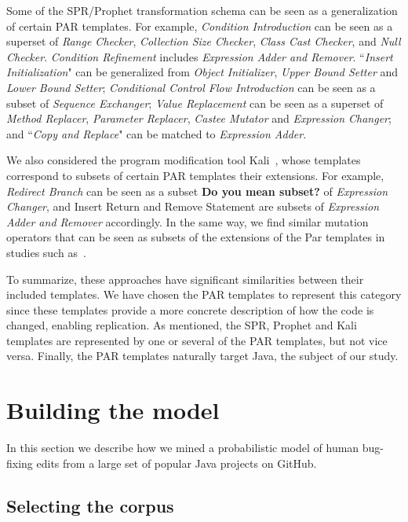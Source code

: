 \documentclass[conference]{IEEEtran}
\newcommand{\todo}[1]
  {{\scriptsize \textbf{\color{red} {#1}}}}
\begin{document}
Some of the SPR/Prophet transformation schema can be seen as a generalization of certain PAR 
templates. For example, \emph{Condition Introduction} can be seen as a superset of 
\emph{Range Checker}, \emph{Collection Size 
Checker}, \emph{Class Cast Checker}, and \emph{Null Checker}. \emph{Condition Refinement} includes \emph{Expression Adder and Remover}. ``\emph{Insert Initialization}" can be 
generalized from \emph{Object Initializer}, \emph{Upper Bound Setter} and \emph{Lower Bound Setter}; \emph{Conditional Control Flow Introduction} can be 
seen as a subset of \emph{Sequence Exchanger};
\emph{Value Replacement} can be seen as a superset of \emph{Method 
Replacer}, \emph{Parameter Replacer}, \emph{Castee Mutator} and \emph{Expression Changer}; and ``\emph{Copy 
and Replace}" can be matched to \emph{Expression Adder}. 

We also considered the program modification tool Kali~\cite{Qi15}, whose
templates correspond to subsets of certain PAR templates their extensions. 
For example, \emph{Redirect Branch} can be seen as
a subset \todo{Do you mean subset?}  of \emph{Expression Changer}, and Insert Return and Remove Statement are
subsets of \emph{Expression Adder and Remover} accordingly. In the same way, we find
similar mutation operators that can be seen as subsets of the extensions of the
Par templates in studies such as~\cite{Offutt96,Offutt06}. 

To summarize, these approaches have significant similarities between their
included templates.  We have chosen the PAR templates to represent this category 
since these templates provide a more concrete description of how the code is 
changed, enabling replication. As mentioned, 
the SPR, Prophet and Kali templates are represented by one or several of the PAR
templates, but not vice versa.  Finally, the PAR templates naturally target
Java, the subject of our study. 

\section{Building the model} \label{buildingTheModel}

In this section we describe how we mined a probabilistic
model of human bug-fixing edits from a large set of popular Java projects on GitHub. 

\subsection{Selecting the corpus}
\end{document}
